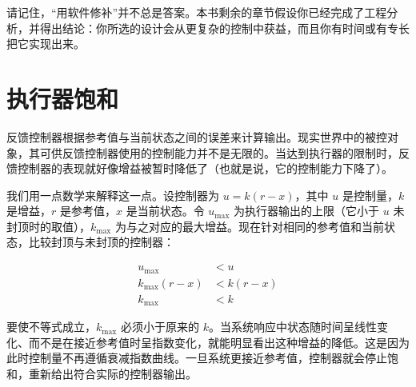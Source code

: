 请记住，``用软件修补''并不总是答案。本书剩余的章节假设你已经完成了工程分析，并得出结论：你所选的设计会从更复杂的控制中获益，而且你有时间或有专长把它实现出来。

\section{执行器饱和}
\label{sec:saturation}

反馈控制器根据参考值与当前状态之间的误差来计算输出。现实世界中的被控对象，其可供反馈控制器使用的控制能力并不是无限的。当达到执行器的限制时，反馈控制器的表现就好像增益被暂时降低了（也就是说，它的控制能力下降了）。

我们用一点数学来解释这一点。设控制器为 $u = k(r - x)$，其中 $u$ 是控制量，$k$ 是增益，$r$ 是参考值，$x$ 是当前状态。令 $u_{\max}$ 为执行器输出的上限（它小于 $u$ 未封顶时的取值），$k_{\max}$ 为与之对应的最大增益。现在针对相同的参考值和当前状态，比较封顶与未封顶的控制器：

\begin{align*}
  u_{\max} &< u \\
  k_{\max} (r - x) &< k (r - x) \\
  k_{\max} &< k
\end{align*}

要使不等式成立，$k_{\max}$ 必须小于原来的 $k$。当系统响应中状态随时间呈线性变化、而不是在接近参考值时呈指数变化，就能明显看出这种增益的降低。这是因为此时控制量不再遵循衰减指数曲线。一旦系统更接近参考值，控制器就会停止饱和，重新给出符合实际的控制器输出。
